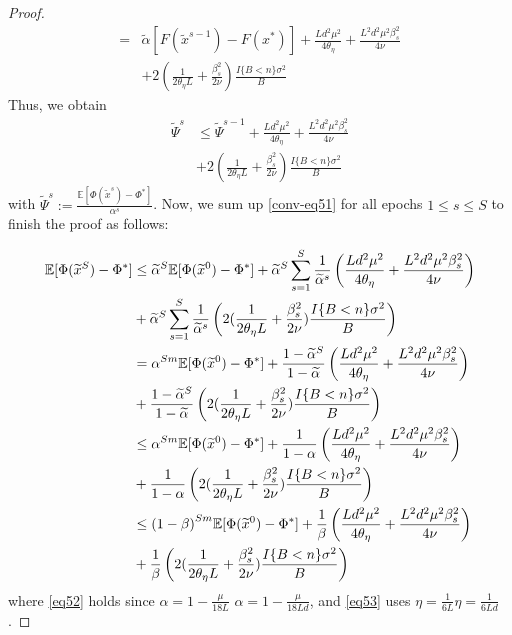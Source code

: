 \documentclass{article}
\newcommand*{\E}{\mathbb{E}}
\theoremstyle{definition}
\theoremstyle{remark}
\begin{document}
{\begin{proof}
\begin{equation}
\begin{split}
=&\tilde{\alpha}[F(\widetilde{x}^{s-1})-F(x^*)] +\frac{Ld^2\mu^2}{4\theta_{\eta}}+\frac{ L^2d^2\mu^2\beta_s^2}{4\nu}\\
&+2(\frac{1}{2\theta_{\eta} L}+\frac{\beta_s^2}{2\nu})\frac{I\{B < n\} \sigma ^2}{B}
\end{split}
\end{equation}
Thus, we obtain
 {\color{blue}
\begin{equation}\label{conv-eq51}
\begin{split}
\widetilde{\Psi}^s &\leq \widetilde{\Psi}^{s-1} + \frac{Ld^2\mu^2}{4\theta_{\eta}}+\frac{ L^2d^2\mu^2\beta_s^2}{4\nu}\\
&+2(\frac{1}{2\theta_{\eta} L}+\frac{\beta_s^2}{2\nu})\frac{I\{B < n\} \sigma ^2}{B}
\end{split}
\end{equation}
}
with $\widetilde{\Psi}^s := \frac{\E[\Phi(\tilde{x}^s)-\Phi^*]}{{\alpha}^s}$. Now, we sum up \eqref{conv-eq51} for all epochs $1 \leq s \leq S$ to finish the proof as follows:

{\color{blue}
\begin{align}
\E[\Phi(\widetilde{x}^S) - {\Phi}^*] & \leq \widetilde{\alpha}^{S} \E[\Phi(\widetilde{x}^0) - {\Phi}^*] +\widetilde{\alpha}^{S} \sum_{s=1}^S \frac{1}{\widetilde{\alpha}^s}\left(\frac{Ld^2\mu^2}{4\theta_{\eta}}+\frac{ L^2d^2\mu^2\beta_s^2}{4\nu}\right)\notag\\
&+\widetilde{\alpha}^{S} \sum_{s=1}^S \frac{1}{\widetilde{\alpha}^s}\left(2(\frac{1}{2\theta_{\eta} L}+\frac{\beta_s^2}{2\nu})\frac{I\{B < n\} \sigma ^2}{B}\right)\\
& = {\alpha}^{Sm} \E[\Phi(\widetilde{x}^0) - {\Phi}^*]+\frac{1-\widetilde{\alpha}^S}{1-\widetilde{\alpha}}\left(\frac{Ld^2\mu^2}{4\theta_{\eta}}+\frac{ L^2d^2\mu^2\beta_s^2}{4\nu}\right)\notag\\
&+ \frac{1-\widetilde{\alpha}^S}{1-\widetilde{\alpha}}\left(2(\frac{1}{2\theta_{\eta} L}+\frac{\beta_s^2}{2\nu})\frac{I\{B < n\} \sigma ^2}{B}\right)\notag\\
& \leq {\alpha}^{Sm} \E[\Phi(\widetilde{x}^0) - {\Phi}^*]+\frac{1}{1-{\alpha}}\left(\frac{Ld^2\mu^2}{4\theta_{\eta}}+\frac{ L^2d^2\mu^2\beta_s^2}{4\nu}\right)\notag\\
&+ \frac{1}{1-{\alpha}}\left(2(\frac{1}{2\theta_{\eta} L}+\frac{\beta_s^2}{2\nu})\frac{I\{B < n\} \sigma ^2}{B}\right)\notag\\
& \leq {(1-\beta)}^{Sm} \E[\Phi(\widetilde{x}^0) - {\Phi}^*]+\frac{1}{{\beta}}\left(\frac{Ld^2\mu^2}{4\theta_{\eta}}+\frac{ L^2d^2\mu^2\beta_s^2}{4\nu}\right)\notag\\
&+ \frac{1}{\beta}\left(2(\frac{1}{2\theta_{\eta} L}+\frac{\beta_s^2}{2\nu})\frac{I\{B < n\} \sigma ^2}{B}\right)\notag
\end{align}
}
where \eqref{eq52} holds since $\alpha = 1-\frac{\mu}{18L}$ {\color{blue}$\alpha = 1-\frac{\mu}{18Ld}$}, and \eqref{eq53} uses $\eta = \frac{1}{6L}${\color{blue}$\eta = \frac{1}{6Ld}$}.
\end{proof}
}
\end{document}
